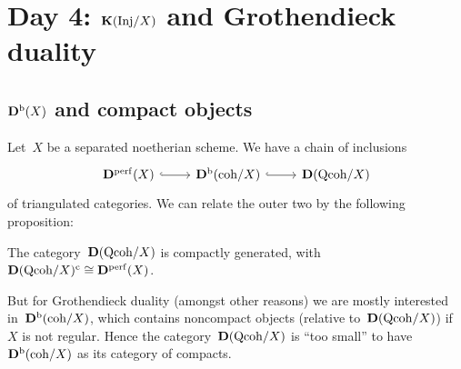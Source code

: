 \documentclass[10pt,a4paper]{article}
\begin{document}
\section{Day 4: $\mathbf{K}(\mathrm{Inj}/X)$ and Grothendieck duality}
\subsection{$\mathbf{D}^{\mathrm{b}}(X)$ and compact objects}
Let~$X$ be a separated noetherian scheme. We have a chain of inclusions
\begin{equation}
  \begin{tikzcd}
    \derived^\perf(X) \arrow[hook]{r} & \derived^\bounded(\coh/X) \arrow[hook]{r} & \derived(\Qcoh/X)
  \end{tikzcd}
\end{equation}
of triangulated categories. We can relate the outer two by the following proposition:
\begin{proposition}
  The category~$\mathbf{D}(\mathrm{Qcoh}/X)$ is compactly generated, with~$\mathbf{D}(\mathrm{Qcoh}/X)^{\mathrm{c}}\cong\mathbf{D}^{\mathrm{perf}}(X)$.
\end{proposition}

But for Grothendieck duality (amongst other reasons) we are mostly interested in~$\mathbf{D}^{\mathrm{b}}(\mathrm{coh}/X)$, which contains noncompact objects (relative to~$\mathbf{D}(\mathrm{Qcoh}/X)$) if~$X$ is not regular. Hence the category~$\mathbf{D}(\mathrm{Qcoh}/X)$ is ``too small'' to have~$\mathbf{D}^{\mathrm{b}}(\mathrm{coh}/X)$ as its category of compacts.
\end{document}
